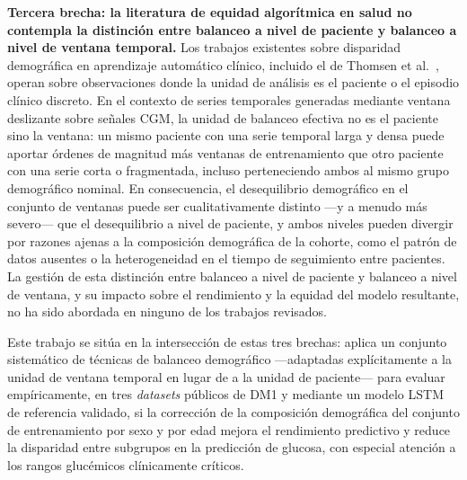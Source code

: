 \textbf{Tercera brecha: la literatura de equidad algorítmica en salud no contempla
la distinción entre balanceo a nivel de paciente y balanceo a nivel de ventana
temporal.} Los trabajos existentes sobre disparidad demográfica en aprendizaje
automático clínico, incluido el de Thomsen et al.~\cite{thomsen2025racial},
operan sobre observaciones donde la unidad de análisis es el paciente o el
episodio clínico discreto. En el contexto de series temporales generadas mediante
ventana deslizante sobre señales CGM, la unidad de balanceo efectiva no es el
paciente sino la ventana: un mismo paciente con una serie temporal larga y densa
puede aportar órdenes de magnitud más ventanas de entrenamiento que otro paciente
con una serie corta o fragmentada, incluso perteneciendo ambos al mismo grupo
demográfico nominal. En consecuencia, el desequilibrio demográfico en el conjunto
de ventanas puede ser cualitativamente distinto —y a menudo más severo— que el
desequilibrio a nivel de paciente, y ambos niveles pueden divergir por razones
ajenas a la composición demográfica de la cohorte, como el patrón de datos
ausentes o la heterogeneidad en el tiempo de seguimiento entre pacientes. La
gestión de esta distinción entre balanceo a nivel de paciente y balanceo a nivel
de ventana, y su impacto sobre el rendimiento y la equidad del modelo resultante,
no ha sido abordada en ninguno de los trabajos revisados.

Este trabajo se sitúa en la intersección de estas tres brechas: aplica un conjunto
sistemático de técnicas de balanceo demográfico —adaptadas explícitamente a la
unidad de ventana temporal en lugar de a la unidad de paciente— para evaluar
empíricamente, en tres \emph{datasets} públicos de DM1 y mediante un modelo LSTM
de referencia validado, si la corrección de la composición demográfica del
conjunto de entrenamiento por sexo y por edad mejora el rendimiento predictivo y
reduce la disparidad entre subgrupos en la predicción de glucosa, con especial
atención a los rangos glucémicos clínicamente críticos.

